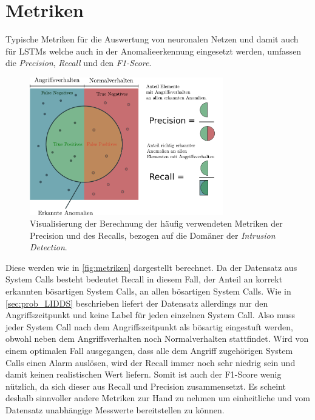                 \fi

\section{Metriken}\label{sec:Metriken}

    Typische Metriken für die Auswertung von neuronalen Netzen und damit auch für \acp{LSTM} welche auch in der Anomalieerkennung eingesetzt werden, umfassen die \textit{Precision}, \textit{Recall} und den \textit{F1-Score}.
    \begin{figure}
        \centering
        \includegraphics[width=0.75\textwidth]{images/Illustrationen/Precision.pdf}
        \caption{Visualisierung der Berechnung der häufig verwendeten Metriken der Precision und des Recalls, bezogen auf die Domäner der \textit{Intrusion Detection}.}\label{fig:metriken}
    \end{figure}
    Diese werden wie in \autoref{fig:metriken} dargestellt berechnet.
    Da der Datensatz aus System Calls besteht bedeutet Recall in diesem Fall, der Anteil an korrekt erkannten bösartigen System Calls, an allen bösartigen System Calls.
    Wie in \autoref{sec:prob_LIDDS} beschrieben liefert der Datensatz allerdings nur den Angriffszeitpunkt und keine Label für jeden einzelnen System Call.
    Also muss jeder System Call nach dem Angriffszeitpunkt als bösartig eingestuft werden, obwohl neben dem Angriffsverhalten noch Normalverhalten stattfindet.
    Wird von einem optimalen Fall ausgegangen, dass alle dem Angriff zugehörigen System Calls einen Alarm auslösen, wird der Recall immer noch sehr niedrig sein und damit keinen realistischen Wert liefern.
    Somit ist auch der F1-Score wenig nützlich, da sich dieser aus Recall und Precision zusammensetzt.
    Es scheint deshalb sinnvoller andere Metriken zur Hand zu nehmen um einheitliche und vom Datensatz unabhängige Messwerte bereitstellen zu können. 
